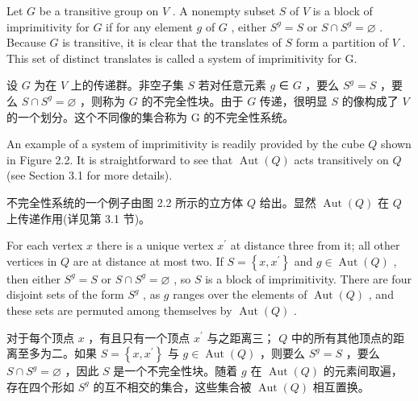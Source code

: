 \documentclass[10pt]{article}
\begin{document}
Let \(G\) be a transitive group on \(V\) . A nonempty subset \(S\) of \(V\) is a block of imprimitivity for \(G\) if for any element \(g\) of \(G\) , either \({S}^{g} = S\) or \(S \cap  {S}^{g} = \varnothing\) . Because \(G\) is transitive, it is clear that the translates of \(S\) form a partition of \(V\) . This set of distinct translates is called a system of imprimitivity for G.

\begin{tcolorbox}\relax
设 \(G\) 为在 \(V\) 上的传递群。非空子集 \(S\) 若对任意元素 \(g\) ∈ \(G\) ，要么 \({S}^{g} = S\) ，要么 \(S \cap  {S}^{g} = \varnothing\) ，则称为 \(G\) 的不完全性块。由于 \(G\) 传递，很明显 \(S\) 的像构成了 \(V\) 的一个划分。这个不同像的集合称为 G 的不完全性系统。
\end{tcolorbox}

An example of a system of imprimitivity is readily provided by the cube \(Q\) shown in Figure 2.2. It is straightforward to see that \(\operatorname{Aut}\left( Q\right)\) acts transitively on \(Q\) (see Section 3.1 for more details).

\begin{tcolorbox}\relax
不完全性系统的一个例子由图 2.2 所示的立方体 \(Q\) 给出。显然 \(\operatorname{Aut}\left( Q\right)\) 在 \(Q\) 上传递作用(详见第 3.1 节)。
\end{tcolorbox}

For each vertex \(x\) there is a unique vertex \({x}^{\prime }\) at distance three from it; all other vertices in \(Q\) are at distance at most two. If \(S = \left\{  {x,{x}^{\prime }}\right\}\) and \(g \in  \operatorname{Aut}\left( Q\right)\) , then either \({S}^{g} = S\) or \(S \cap  {S}^{g} = \varnothing\) , so \(S\) is a block of imprimitivity. There are four disjoint sets of the form \({S}^{g}\) , as \(g\) ranges over the elements of \(\operatorname{Aut}\left( Q\right)\) , and these sets are permuted among themselves by \(\operatorname{Aut}\left( Q\right)\) .

\begin{tcolorbox}\relax
对于每个顶点 \(x\) ，有且只有一个顶点 \({x}^{\prime }\) 与之距离三； \(Q\) 中的所有其他顶点的距离至多为二。如果 \(S = \left\{  {x,{x}^{\prime }}\right\}\) 与 \(g \in  \operatorname{Aut}\left( Q\right)\) ，则要么 \({S}^{g} = S\) ，要么 \(S \cap  {S}^{g} = \varnothing\) ，因此 \(S\) 是一个不完全性块。随着 \(g\) 在 \(\operatorname{Aut}\left( Q\right)\) 的元素间取遍，存在四个形如 \({S}^{g}\) 的互不相交的集合，这些集合被 \(\operatorname{Aut}\left( Q\right)\) 相互置换。
\end{tcolorbox}
\end{document}
